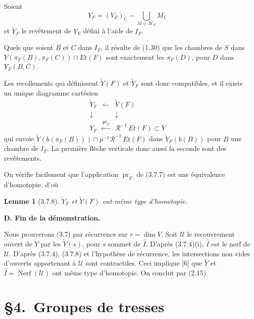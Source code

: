 \documentclass[12pt]{article}
\newtheorem{lemme}[theoreme]{Lemme}
\theoremstyle{remark}
\newcommand{\CC}{\mathbb{C}}
\begin{document}
Soient
\[Y_F = (V_F)_\CC - \bigcup_{M \in \mathcal{M}_F} M_\CC\]
et $\tilde{Y}_F$ le revêtement de $Y_F$ défini à l'aide de $I_F$.

Quels que soient $B$ et $C$ dans $I_F$, il résulte de (1.30) que les chambres de $S$ dans $Y(\pi_F(B), \pi_F(C)) \cap Et(F)$ sont exactement les $\pi_F(D)$, pour $D$ dans $Y_F(B, C)$.

Les recollements qui définissent $\tilde{Y}(F)$ et $\tilde{Y}_F$ sont donc compatibles, et il existe un unique diagramme cartésien
\begin{equation}
\begin{array}{ccc}
\tilde{Y}_F & \longleftarrow & \tilde{Y}(F) \\
\downarrow & & \downarrow \\
Y_F & \xleftarrow{\operatorname{pr}_F} & \mathscr{R}^{-1} \, Et(F) \subset Y
\end{array}\tag{3.7.7}
\end{equation}
qui envoie $\tilde{Y}(b(\pi_F(B))) \cap p^{-1} \mathscr{R}^{-1} \, Et(F)$ dans $\tilde{Y}_F(b(B))$ pour $B$ une chambre de $I_F$. La première flèche verticale donc aussi la seconde sont des revêtements.

On vérifie facilement que l'application $\operatorname{pr}_F$ de (3.7.7) est une équivalence d'homotopie, d'où

\begin{lemme}[3.7.8]
$\tilde{Y}_F$ et $\tilde{Y}(F)$ ont même type d'homotopie.
\end{lemme}

\textbf{D. Fin de la démonstration.}

Nous prouverons (3.7) par récurrence sur $r = \dim V$. Soit $\mathcal{U}$ le recouvrement ouvert de $\tilde{Y}$ par les $\tilde{Y}(s)$, pour $s$ sommet de $\hat{I}$. D'après (3.7.4)(i), $\hat{I}$ est le nerf de $\mathcal{U}$. D'après (3.7.4), (3.7.8) et l'hypothèse de récurrence, les intersections non vides d'ouverts appartenant à $\mathcal{U}$ sont contractiles. Ceci implique [6] que $\tilde{Y}$ et $\hat{I} = \operatorname{Nerf}(\mathcal{U})$ ont même type d'homotopie. On conclut par (2.15).

\section*{\S 4.~Groupes de tresses}
\end{document}
